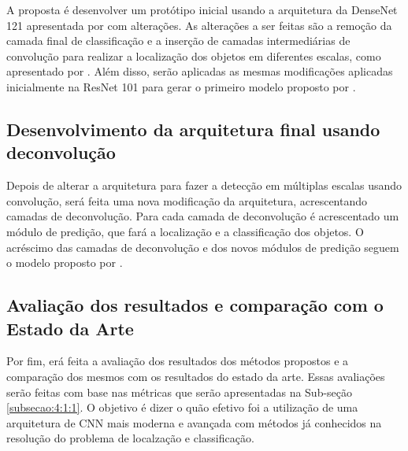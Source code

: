 A proposta é desenvolver um protótipo inicial usando a arquitetura da \ac{DenseNet} 121 apresentada por  com alterações. As alterações a ser feitas são a remoção da camada final de classificação e a inserção de camadas intermediárias de convolução para realizar a localização dos objetos em diferentes escalas, como apresentado por . Além disso, serão aplicadas as mesmas modificações aplicadas inicialmente na \ac{ResNet} 101 para gerar o primeiro modelo proposto por \cite{cheng-2017}.

\subsection{Desenvolvimento da arquitetura final usando deconvolução}
\label{subsecao:4:1:4}

Depois de alterar a arquitetura para fazer a detecção em múltiplas escalas usando convolução, será feita uma nova modificação da arquitetura, acrescentando camadas de deconvolução. Para cada camada de deconvolução é acrescentado um módulo de predição, que fará a localização e a classificação dos objetos. O acréscimo das camadas de deconvolução e dos novos módulos de predição seguem o modelo proposto por .

\subsection{Avaliação dos resultados e comparação com o Estado da Arte}
\label{subsecao:4:1:5}

Por fim, erá feita a avaliação dos resultados dos métodos propostos e a comparação dos mesmos com os resultados do estado da arte. Essas avaliações serão feitas com base nas métricas que serão apresentadas na Sub-seção \ref{subsecao:4:1:1}. O objetivo é dizer o quão efetivo foi a utilização de uma arquitetura de \ac{CNN} mais moderna e avançada com métodos já conhecidos na resolução do problema de localzação e classificação.




